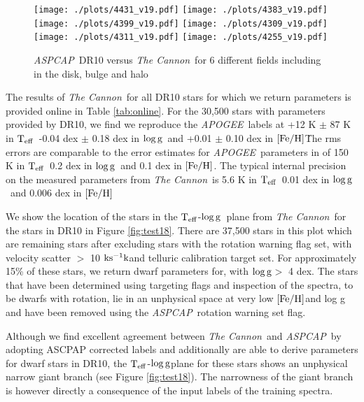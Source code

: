 \documentclass[12pt, preprint]{aastex}
\newcommand{\teff}{\mbox{$\rm T_{eff}$}}
\newcommand{\kms}{\mbox{$\rm ks^{-1} k$}}
\newcommand{\feh}{\mbox{$\rm [Fe/H]$}}
\newcommand{\logg}{\mbox{$\rm \log g$}}
\newcommand{\tc}{\textsl{The Cannon}}
\newcommand{\apogee}{\textsl{APOGEE}}
\newcommand{\aspcap}{\textsl{ASPCAP}}
\begin{document}
\begin{figure}[h!]
\centering
  \texttt{[image: ./plots/4431\_v19.pdf]}
    \texttt{[image: ./plots/4383\_v19.pdf]} \\
      \texttt{[image: ./plots/4399\_v19.pdf]}
        \texttt{[image: ./plots/4309\_v19.pdf]} \\
              \texttt{[image: ./plots/4311\_v19.pdf]}
        \texttt{[image: ./plots/4255\_v19.pdf]} \\
\caption{\small{\aspcap\ DR10 versus \tc\ for 6 different fields including in the disk, bulge and halo}}
\label{fig:cal}
\end{figure}


The results of \tc\ for all DR10 stars for which we return parameters is provided online in Table \ref{tab:online}. For the 30,500 stars with parameters provided by DR10, we find we reproduce the \apogee\ labels at +12 K $\pm$ 87 K in \teff\, -0.04 dex $\pm$  0.18 dex in \logg\ and +0.01 $\pm$ 0.10 dex in \feh\. The rms errors are comparable to the error estimates for \apogee\ parameters in \citet{Meszaros2013} of 150 K in \teff\, 0.2 dex in \logg\ and 0.1 dex in \feh.  The typical internal precision on the measured parameters from \tc\ is 5.6 K in \teff\, 0.01 dex in \logg\ and 0.006 dex in \feh\ 

We show the location of the stars in the \teff-\logg\ plane from \tc\ for the stars in DR10 in Figure \ref{fig:test18}. There are 37,500 stars in this plot which are remaining stars after excluding stars with the  rotation warning flag set, with velocity scatter $>$ 10 \kms and telluric calibration target set. For approximately 15\% of these stars, we return dwarf parameters for, with \logg $>$ 4 dex.  The stars that have been determined using targeting flags and inspection of the spectra, to be dwarfs with rotation, lie in an unphysical space at very low \feh and log g and have been removed using the \aspcap\ rotation warning set flag.

Although we find excellent agreement between \tc\ and \aspcap\ by adopting ASCPAP corrected labels and additionally are able to derive parameters for dwarf stars in DR10, the \teff-\logg plane for these stars shows an unphysical narrow giant branch  (see Figure \ref{fig:test18}). The narrowness of the giant branch is however directly a consequence of the input labels of the training spectra. 

\end{document}
